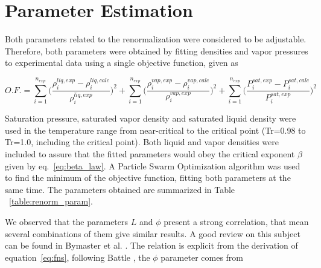 \documentclass[preprint,12pt,3p]{elsarticle}
\begin{document}
\section{Parameter Estimation}
    Both parameters related to the renormalization were considered to be adjustable. Therefore, both parameters were obtained by fitting densities and vapor pressures to experimental data using a single objective function, given as

\begin{equation}   \label{eq:OF}
O.F.=\sum_{i=1}^{n_{exp}} \Bigg(\frac{\rho_{i}^{liq,exp}-\rho_{i}^{liq,calc}}{\rho_{i}^{liq,exp}}\Bigg)^2 + \sum_{i=1}^{n_{exp}} \Bigg(\frac{\rho_{i}^{vap,exp}-\rho_{i}^{vap,calc}}{\rho_{i}^{vap,exp}}\Bigg)^2 + \sum_{i=1}^{n_{exp}} \Bigg(\frac{P_{i}^{sat,exp}-P_{i}^{sat,calc}}{P_{i}^{sat,exp}}\Bigg)^2
\end{equation}

    Saturation pressure, saturated vapor density and saturated liquid density were used in the temperature range from near-critical to the critical point (Tr=0.98 to Tr=1.0, including the critical point). Both liquid and vapor densities were included to assure that the fitted parameters would obey the critical exponent $\beta$ given by eq.~\ref{eq:beta_law}. A Particle Swarm Optimization algorithm was used to find the minimum of the objective function, fitting both parameters at the same time. The parameters obtained are summarized in Table ~\ref{table:renorm_param}.
    
\begin{table}[ht!]
\centering
\caption{Estimated Parameters for the renormalization method}
\label{table:renorm_param}
\end{table}

	We observed that the parameters $L$ and $\phi$ present a strong correlation, that mean several combinations of them give similar results. A good review on this subject can be found in Bymaster et al. \cite{bymaster2008renormalization}. The relation is explicit from the derivation of equation~\ref{eq:fns}, following Battle \cite{battlerenorm}, the $\phi$ parameter comes from
	
\end{document}

